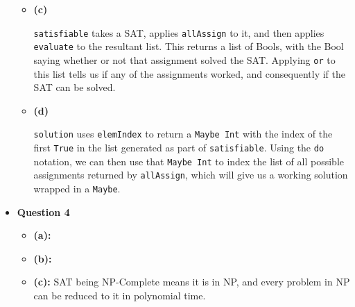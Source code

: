 \documentclass[12pt]{article}
\begin{document}
\begin{itemize}
\begin{itemize}
      \item \textbf{(c)}
        
        \verb|satisfiable| takes a SAT, applies \verb|allAssign| to it, and then applies \verb|evaluate| to the resultant
        list. This returns a list of Bools, with the Bool saying whether or not that assignment solved the SAT. Applying
        \verb|or| to this list tells us if any of the assignments worked, and consequently if the SAT can be solved.

      \item \textbf{(d)}
        
        \verb|solution| uses \verb|elemIndex| to return a \verb|Maybe Int| with the index of the first \verb|True| in the list
        generated as part of \verb|satisfiable|. Using the \verb|do| notation, we can then use that \verb|Maybe Int| to index the list of
        all possible assignments returned by \verb|allAssign|, which will give us a working solution wrapped in a \verb|Maybe|.
    \end{itemize}

    \pagebreak
  \item \textbf{Question 4}
    \begin{itemize}
      \item \textbf{(a):}\\
      \item \textbf{(b):}
      \item \textbf{(c):} SAT being NP-Complete means it is in NP, and every problem in NP can be reduced to it in
        polynomial time.
    \end{itemize}
\end{itemize}
\end{document}
